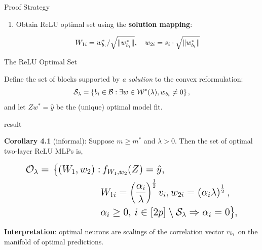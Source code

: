 \documentclass[12pt, usenames, dvipsnames]{beamer}
\newlength{\colwidth}
\newcommand{\blue}[1]{\textcolor{CBBlue}{#1}}
\begin{document}
\begin{frame}[t]
\begin{columns}[t]
\begin{column}{\colwidth}
\begin{block}{Proof Strategy}
\begin{enumerate}
					\item Obtain ReLU optimal set using the \textbf{solution mapping}:

					      { \Large
					      \begin{equation*}\label{eq:convex-to-relu}
						      W_{1i} = w_{b_i}^*/ \sqrt{\|w_{b_i}^*\|}, \quad w_{2i} = s_i \cdot \sqrt{\|w_{b_i}^*\|}
					      \end{equation*}
					      }

				\end{enumerate}

			\end{block}

			\vspace{-1em}
			\begin{block}{The ReLU Optimal Set}

				\large

				Define the set of blocks supported by \emph{a solution} to the convex reformulation:
				\[
					\mathcal{S}_\lambda = \left\{{b_i} \in \mathcal{B} : \exists w \in \mathcal{W}^*(\lambda), w_{b_i} \neq 0\right\},
				\]
				and let \( Z w^* = \hat y \) be the (unique) optimal model fit.

				\vspace{1em}

				\begin{beamercolorbox}[wd=\textwidth,sep=1em]{result}

					\textbf{Corollary 4.1} (informal):
					Suppose \( m \geq m^* \) and \( \lambda > 0 \).
					Then the set of optimal two-layer ReLU MLPs is,

					\begin{equation*}\label{eq:relu-sol-fn}
						\Large
						\begin{aligned}
							\mathcal{O}_\lambda  = \,
							\big\{
							(W_1,  w_2) : &
							\, f_{W_1, w_2}(Z)  =  \hat y,                                                                  \\
							              & W_{1i} = \left(\frac{\alpha_{i}}{\lambda}\right)^{\frac{1}{2}} v_i,
							w_{2i} = \left(\alpha_i \lambda\right)^{\frac{1}{2}},                                                  \\
							              & \alpha_i \geq 0, \, i \in [2p] \setminus \mathcal{S}_\lambda \Rightarrow \alpha_i = 0
							\big\},
						\end{aligned}
					\end{equation*}
				\end{beamercolorbox}

				\textbf{Interpretation}: optimal neurons are scalings of the correlation vector \( v_{b_i} \)
				on the \blue{manifold of optimal predictions}.


\end{block}
\end{column}
\end{columns}
\end{frame}
\end{document}
